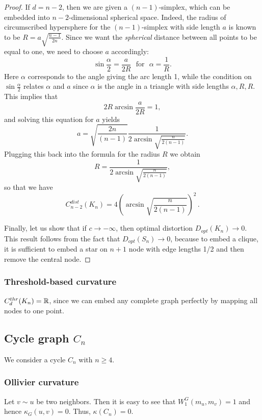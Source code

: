 \documentclass[runningheads]{llncs}
\begin{document}
\begin{proof}
If $d = n-2$, then we are given a $(n-1)$-simplex, which can be embedded into $n-2$-dimensional spherical space. Indeed, the radius of circumscribed hypersphere for the $(n-1)$-simplex with side length $a$ is known to be $R = a\sqrt{\frac{n-1}{2n}}$. Since we want the \textit{spherical} distance between all points to be equal to one, we need to choose $a$ accordingly:
\[
\sin \frac{\alpha}{2} = \frac{a}{2R} \,\,\text{ for } \,\,\alpha = \frac{1}{R}.
\]
Here $\alpha$ corresponds to the angle giving the arc length 1, while the condition on $\sin \frac{\alpha}{2}$ relates $\alpha$ and $a$ since $\alpha$ is the angle in a triangle with side lengths $\alpha, R, R$.
This implies that
\[
2 R \arcsin \frac{a}{2R} = 1,
\]
and solving this equation for $a$ yields
\[
a  = \sqrt{\frac{2n}{(n-1)}}\frac{1}{2\arcsin \sqrt{\frac{n}{2(n-1)}}}.
\]
Plugging this back into the formula for the radius $R$ we obtain
\[
R = \frac{1}{2\arcsin \sqrt{\frac{n}{2(n-1)}}},
\]
so that we have
\[
C_{n-2}^{dist}(K_n) = 4 \left(\arcsin \sqrt{\frac{n}{2(n-1)}}\right)^2\,.
\]

Finally, let us show that if $c \to -\infty$, then optimal distortion $D_{opt}(K_n) \to 0$. This result follows from the fact that $D_{opt}(S_n) \to 0$, because to embed a clique, it is sufficient to embed a star on $n+1$ node with edge lengths 1/2 and then remove the central node. 
\end{proof}


\subsubsection{Threshold-based curvature} 
$C_d^{thr}(K_n) = \mathbb{R}$, since we can embed any complete graph perfectly by mapping all nodes to one point. 

\subsection{Cycle graph $C_n$} 

We consider a cycle $C_n$ with $n \ge 4$.

\subsubsection{Ollivier curvature}  
Let $v \sim u$ be two neighbors. Then it is easy to see that $W_1^G(m_u,m_v) = 1$ and hence $\kappa_G(u,v) = 0$. Thus, $\kappa(C_n) = 0$.
\end{document}
